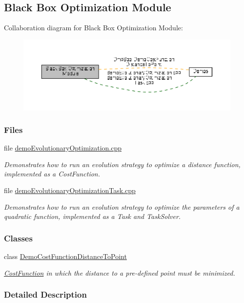 \hypertarget{group__BBO}{\subsection{Black Box Optimization Module}
\label{group__BBO}
}
Collaboration diagram for Black Box Optimization Module\+:
\nopagebreak
\begin{figure}[H]
\begin{center}
\leavevmode
\includegraphics[width=350pt]{group__BBO}
\end{center}
\end{figure}
\subsubsection*{Files}
\begin{DoxyCompactItemize}
\item 
file \hyperlink{demoEvolutionaryOptimization_8cpp}{demo\+Evolutionary\+Optimization.\+cpp}
\begin{DoxyCompactList}\small\item\em Demonstrates how to run an evolution strategy to optimize a distance function, implemented as a Cost\+Function. \end{DoxyCompactList}\item 
file \hyperlink{demoEvolutionaryOptimizationTask_8cpp}{demo\+Evolutionary\+Optimization\+Task.\+cpp}
\begin{DoxyCompactList}\small\item\em Demonstrates how to run an evolution strategy to optimize the parameters of a quadratic function, implemented as a Task and Task\+Solver. \end{DoxyCompactList}\end{DoxyCompactItemize}
\subsubsection*{Classes}
\begin{DoxyCompactItemize}
\item 
class \hyperlink{classDmpBbo_1_1DemoCostFunctionDistanceToPoint}{Demo\+Cost\+Function\+Distance\+To\+Point}
\begin{DoxyCompactList}\small\item\em \hyperlink{classDmpBbo_1_1CostFunction}{Cost\+Function} in which the distance to a pre-\/defined point must be minimized. \end{DoxyCompactList}\end{DoxyCompactItemize}


\subsubsection{Detailed Description}
